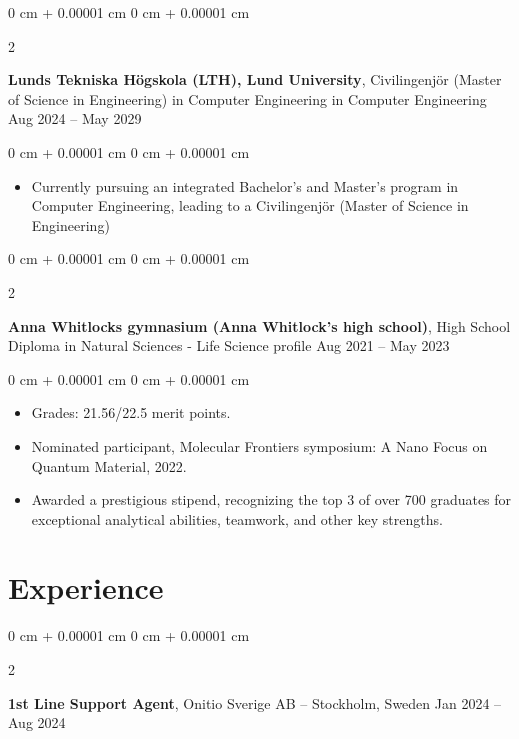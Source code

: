 \documentclass[10pt, letterpaper]{article}
\newenvironment{highlights}{
    \begin{itemize}[
        topsep=0.10 cm,
        parsep=0.10 cm,
        partopsep=0pt,
        itemsep=0pt,
        leftmargin=0 cm + 10pt
    ]
}{
    \end{itemize}
} %
\newenvironment{onecolentry}{
    \begin{adjustwidth}{
        0 cm + 0.00001 cm
    }{
        0 cm + 0.00001 cm
    }
}{
    \end{adjustwidth}
} %
\newenvironment{twocolentry}[2][]{
    \onecolentry
    \def\secondColumn{#2}
    \setcolumnwidth{\fill, 4.5 cm}
    \begin{paracol}{2}
}{
    \switchcolumn \raggedleft \secondColumn
    \end{paracol}
    \endonecolentry
} %
\begin{document}
        
        \begin{twocolentry}{
            Aug 2024 – May 2029
        }
            \textbf{Lunds Tekniska Högskola (LTH), Lund University}, Civilingenjör (Master of Science in Engineering) in Computer Engineering in Computer Engineering\end{twocolentry}

        \vspace{0.10 cm}
        \begin{onecolentry}
            \begin{highlights}
                \item Currently pursuing an integrated Bachelor's and Master's program in Computer Engineering, leading to a Civilingenjör (Master of Science in Engineering)
            \end{highlights}
        \end{onecolentry}


        \vspace{0.2 cm}

        \begin{twocolentry}{
            Aug 2021 – May 2023
        }
            \textbf{Anna Whitlocks gymnasium (Anna Whitlock's high school)}, High School Diploma in Natural Sciences - Life Science profile\end{twocolentry}

        \vspace{0.10 cm}
        \begin{onecolentry}
            \begin{highlights}
                \item Grades: 21.56/22.5 merit points.
                \item Nominated participant, Molecular Frontiers symposium: A Nano Focus on Quantum Material, 2022.
                \item Awarded a prestigious stipend, recognizing the top 3 of over 700 graduates for exceptional analytical abilities, teamwork, and other key strengths.
            \end{highlights}
        \end{onecolentry}



    
    \section{Experience}



        
        \begin{twocolentry}{
            Jan 2024 – Aug 2024
        }
            \textbf{1st Line Support Agent}, Onitio Sverige AB -- Stockholm, Sweden\end{twocolentry}
\end{document}

